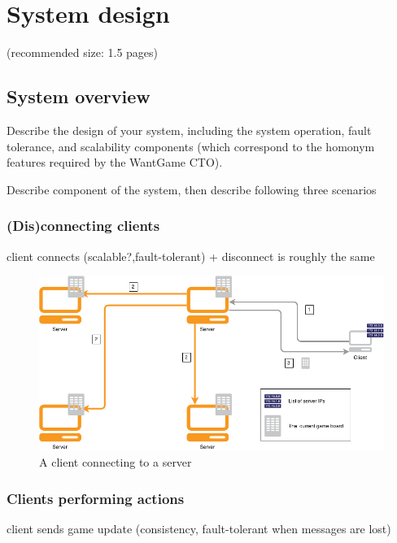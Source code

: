 \section{System design}
(recommended size: 1.5 pages)

\subsection{System overview}
Describe the design of your system, including the system
operation, fault tolerance, and scalability components (which correspond to the
homonym features required by the WantGame CTO).

Describe component of the system, then describe following three scenarios 

\subsubsection*{(Dis)connecting clients}
client connects (scalable?,fault-tolerant) + disconnect is roughly the same

\begin{figure}[h!]
  \centering
    \includegraphics[width=\textwidth]{diagrams/connecting-client}
    
  \caption{A client connecting to a server}
  \label{connect_diagram}
\end{figure}

\subsubsection*{Clients performing actions}
client sends game update (consistency, fault-tolerant when messages are lost)

